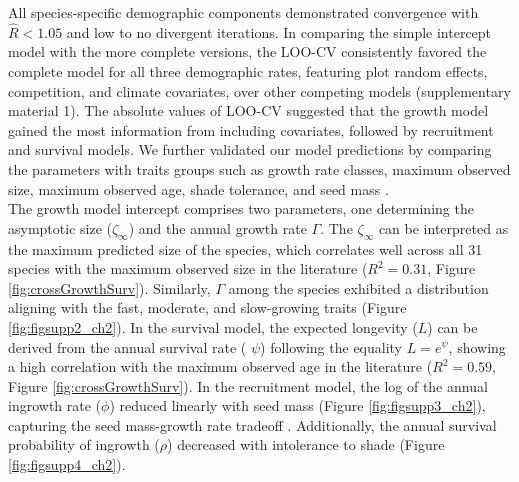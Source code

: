All species-specific demographic components demonstrated convergence
with \(\hat{R} <1.05\) and low to no divergent iterations. In comparing
the simple intercept model with the more complete versions, the LOO-CV
consistently favored the complete model for all three demographic rates,
featuring plot random effects, competition, and climate covariates, over
other competing models (supplementary material 1). The absolute values
of LOO-CV suggested that the growth model gained the most information
from including covariates, followed by recruitment and survival models.
We further validated our model predictions by comparing the parameters
with traits groups such as growth rate classes, maximum observed size,
maximum observed age, shade tolerance, and seed mass
\citep{burns1990silvics, diaz2022}.\\

The growth model intercept comprises two parameters, one determining the
asymptotic size (\(\zeta_{\infty}\)) and the annual growth rate
\(\Gamma\). The \(\zeta_{\infty}\) can be interpreted as the maximum
predicted size of the species, which correlates well across all 31
species with the maximum observed size in the literature
(\(R^2 = 0.31\), Figure \ref{fig:crossGrowthSurv}). Similarly,
\(\Gamma\) among the species exhibited a distribution aligning with the
fast, moderate, and slow-growing traits (Figure \ref{fig:figsupp2_ch2}). In the survival
model, the expected longevity (\(L\)) can be derived from the annual
survival rate ( \(\psi\)) following the equality \(L = e^{\psi}\),
showing a high correlation with the maximum observed age in the
literature (\(R^2 = 0.59\), Figure \ref{fig:crossGrowthSurv}). In the
recruitment model, the log of the annual ingrowth rate (\(\phi\))
reduced linearly with seed mass (Figure \ref{fig:figsupp3_ch2}), capturing the seed
mass-growth rate tradeoff \citep{Reich1998}. Additionally, the annual
survival probability of ingrowth (\(\rho\)) decreased with intolerance
to shade (Figure \ref{fig:figsupp4_ch2}).\\

